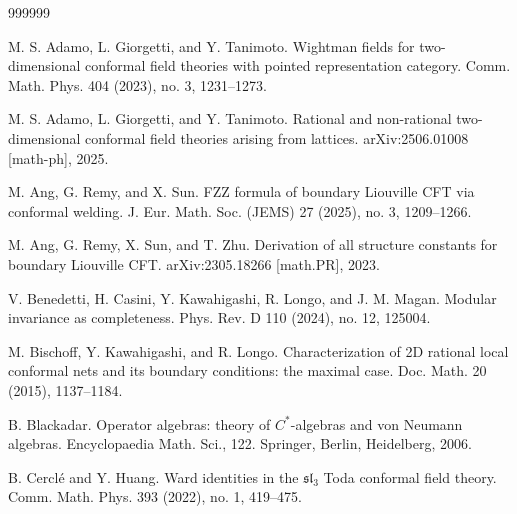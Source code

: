 \documentclass[11pt,b5paper,notitlepage]{article}
\theoremstyle{definition}
\theoremstyle{plain}
\numberwithin{equation}{section}
\begin{document}
	\begin{thebibliography}{999999}
		\footnotesize	


M. S. Adamo, L. Giorgetti, and Y. Tanimoto.
Wightman fields for two-dimensional conformal field theories with pointed representation category.
Comm. Math. Phys. 404 (2023), no. 3, 1231--1273.




M. S. Adamo, L. Giorgetti, and Y. Tanimoto.
Rational and non-rational two-dimensional conformal field theories arising from lattices. arXiv:2506.01008 [math-ph], 2025.


M. Ang, G. Remy, and X. Sun.
FZZ formula of boundary Liouville CFT via conformal welding.
J. Eur. Math. Soc. (JEMS) 27 (2025), no. 3, 1209--1266.


M. Ang, G. Remy, X. Sun, and T. Zhu.
Derivation of all structure constants for boundary Liouville CFT.
arXiv:2305.18266 [math.PR], 2023.



V. Benedetti, H. Casini, Y. Kawahigashi, R. Longo, and J. M. Magan.
Modular invariance as completeness.
Phys. Rev. D 110 (2024), no. 12, 125004.






M. Bischoff, Y. Kawahigashi, and R. Longo.
Characterization of 2D rational local conformal nets and its boundary conditions: the maximal case.
Doc. Math. 20 (2015), 1137--1184.



B. Blackadar. Operator algebras: theory of $C^*$-algebras and von Neumann algebras. Encyclopaedia Math. Sci., 122. Springer, Berlin, Heidelberg, 2006.

B. Cercl\'e and Y. Huang.
Ward identities in the $\mathfrak{sl}_3$ Toda conformal field theory.
Comm. Math. Phys. 393 (2022), no. 1, 419--475.


\end{thebibliography}
\end{document}
